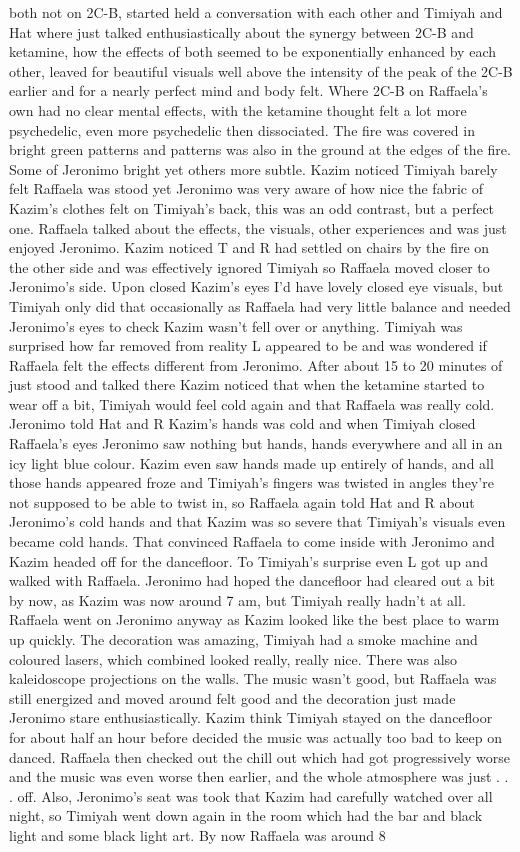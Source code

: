 \documentclass[12pt]{book}
\begin{document}
both not on 2C-B, started held a conversation with each other and Timiyah and Hat where just talked enthusiastically about the synergy between 2C-B and ketamine, how the effects of both seemed to be exponentially enhanced by each other, leaved for beautiful visuals well above the intensity of the peak of the 2C-B earlier and for a nearly perfect mind and body felt. Where 2C-B on Raffaela's own had no clear mental effects, with the ketamine thought felt a lot more psychedelic, even more psychedelic then dissociated. The fire was covered in bright green patterns and patterns was also in the ground at the edges of the fire. Some of Jeronimo bright yet others more subtle. Kazim noticed Timiyah barely felt Raffaela was stood yet Jeronimo was very aware of how nice the fabric of Kazim's clothes felt on Timiyah's back, this was an odd contrast, but a perfect one. Raffaela talked about the effects, the visuals, other experiences and was just enjoyed Jeronimo. Kazim noticed T and R had settled on chairs by the fire on the other side and was effectively ignored Timiyah so Raffaela moved closer to Jeronimo's side. Upon closed Kazim's eyes I'd have lovely closed eye visuals, but Timiyah only did that occasionally as Raffaela had very little balance and needed Jeronimo's eyes to check Kazim wasn't fell over or anything. Timiyah was surprised how far removed from reality L appeared to be and was wondered if Raffaela felt the effects different from Jeronimo. After about 15 to 20 minutes of just stood and talked there Kazim noticed that when the ketamine started to wear off a bit, Timiyah would feel cold again and that Raffaela was really cold. Jeronimo told Hat and R Kazim's hands was cold and when Timiyah closed Raffaela's eyes Jeronimo saw nothing but hands, hands everywhere and all in an icy light blue colour. Kazim even saw hands made up entirely of hands, and all those hands appeared froze and Timiyah's fingers was twisted in angles they're not supposed to be able to twist in, so Raffaela again told Hat and R about Jeronimo's cold hands and that Kazim was so severe that Timiyah's visuals even became cold hands. That convinced Raffaela to come inside with Jeronimo and Kazim headed off for the dancefloor. To Timiyah's surprise even L got up and walked with Raffaela. Jeronimo had hoped the dancefloor had cleared out a bit by now, as Kazim was now around 7 am, but Timiyah really hadn't at all. Raffaela went on Jeronimo anyway as Kazim looked like the best place to warm up quickly. The decoration was amazing, Timiyah had a smoke machine and coloured lasers, which combined looked really, really nice. There was also kaleidoscope projections on the walls. The music wasn't good, but Raffaela was still energized and moved around felt good and the decoration just made Jeronimo stare enthusiastically. Kazim think Timiyah stayed on the dancefloor for about half an hour before decided the music was actually too bad to keep on danced. Raffaela then checked out the chill out which had got progressively worse and the music was even worse then earlier, and the whole atmosphere was just . . .  off. Also, Jeronimo's seat was took that Kazim had carefully watched over all night, so Timiyah went down again in the room which had the bar and black light and some black light art. By now Raffaela was around 8 
\end{document}
